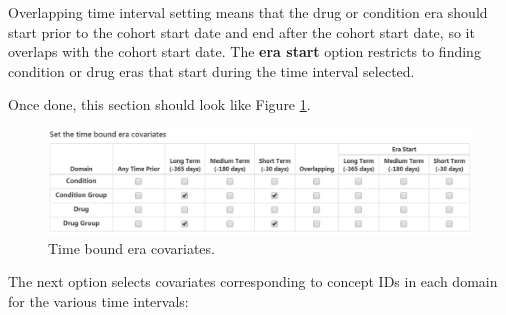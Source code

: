 \documentclass[11pt]{book}
\theoremstyle{definition}
\theoremstyle{definition}
\theoremstyle{definition}
\theoremstyle{remark}
\begin{document}
Overlapping time interval setting means that the drug or condition era
should start prior to the cohort start date and end after the cohort
start date, so it overlaps with the cohort start date. The \textbf{era
start} option restricts to finding condition or drug eras that start
during the time interval selected.

Once done, this section should look like Figure
\ref{fig:covariateSettings4}.

\begin{figure}

{\centering \includegraphics[width=1\linewidth]{images/PatientLevelPrediction/covariateSettings4} 

}

\caption{Time bound era covariates.}\label{fig:covariateSettings4}
\end{figure}

The next option selects covariates corresponding to concept IDs in each
domain for the various time intervals:
\end{document}
